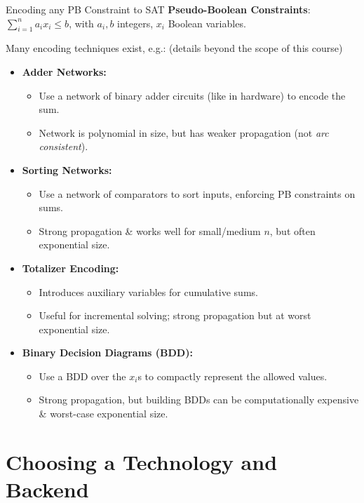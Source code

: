 \documentclass{cons-beamer}
\begin{document}
\begin{frame}{Encoding any PB Constraint to SAT}
  \small
  \textbf{Pseudo-Boolean Constraints}: $\sum_{i=1}^n a_i x_i \leq b$, with $a_i, b$ integers, $x_i$ Boolean variables.
  \vfill

  Many encoding techniques exist, e.g.: (details beyond the scope of this course)
  \begin{itemize}
    \item \textbf{Adder Networks:}
      \begin{itemize}
        \item Use a network of binary adder circuits (like in hardware) to encode the sum.
        \item Network is polynomial in size, but has weaker propagation (not \textit{arc consistent}).
      \end{itemize}
        
    \item \textbf{Sorting Networks:}
      \begin{itemize}
        \item Use a network of comparators to sort inputs, enforcing PB constraints on sums.
        \item Strong propagation \& works well for small/medium $n$, but often exponential size.
      \end{itemize}

    \item \textbf{Totalizer Encoding:}
      \begin{itemize}
        \item Introduces auxiliary variables for cumulative sums.
        \item Useful for incremental solving; strong propagation but at worst exponential size.
      \end{itemize}
        
    \item \textbf{Binary Decision Diagrams (BDD):}
      \begin{itemize}
        \item Use a BDD over the $x_i$s to compactly represent the allowed values.
        \item Strong propagation, but building BDDs can be computationally expensive \& worst-case exponential size.
      \end{itemize}\vfill
  \end{itemize}
\end{frame}


\section*{Choosing a Technology and Backend}
\end{document}
